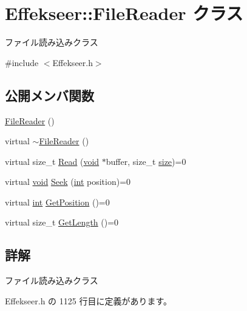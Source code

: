 \hypertarget{class_effekseer_1_1_file_reader}{}\section{Effekseer\+:\+:File\+Reader クラス}
\label{class_effekseer_1_1_file_reader}


ファイル読み込みクラス  




{\ttfamily \#include $<$Effekseer.\+h$>$}

\subsection*{公開メンバ関数}
\begin{DoxyCompactItemize}
\item 
\mbox{\hyperlink{class_effekseer_1_1_file_reader_aa5ae7f1e7a6c8a8147e4f6d819b361c0}{File\+Reader}} ()
\item 
virtual \mbox{\hyperlink{class_effekseer_1_1_file_reader_a694f051a464abcda384734c3612062f2}{$\sim$\+File\+Reader}} ()
\item 
virtual size\+\_\+t \mbox{\hyperlink{class_effekseer_1_1_file_reader_a6274b775770e8ac9ba4f212c80e94be1}{Read}} (\mbox{\hyperlink{namespace_effekseer_ab34c4088e512200cf4c2716f168deb56}{void}} $\ast$buffer, size\+\_\+t \mbox{\hyperlink{namespace_effekseer_a73c68f3d33539d30844b9d1e058077f7}{size}})=0
\item 
virtual \mbox{\hyperlink{namespace_effekseer_ab34c4088e512200cf4c2716f168deb56}{void}} \mbox{\hyperlink{class_effekseer_1_1_file_reader_a5daeb98049f994bccf874b2374e36a25}{Seek}} (\mbox{\hyperlink{namespace_effekseer_ace0abf7c2e6947e519ebe8b54cbcc30a}{int}} position)=0
\item 
virtual \mbox{\hyperlink{namespace_effekseer_ace0abf7c2e6947e519ebe8b54cbcc30a}{int}} \mbox{\hyperlink{class_effekseer_1_1_file_reader_ad69aa533374ee6661938c7a81495b6d7}{Get\+Position}} ()=0
\item 
virtual size\+\_\+t \mbox{\hyperlink{class_effekseer_1_1_file_reader_ae802d02a06437baa0ed74f1927617924}{Get\+Length}} ()=0
\end{DoxyCompactItemize}


\subsection{詳解}
ファイル読み込みクラス 

 Effekseer.\+h の 1125 行目に定義があります。



